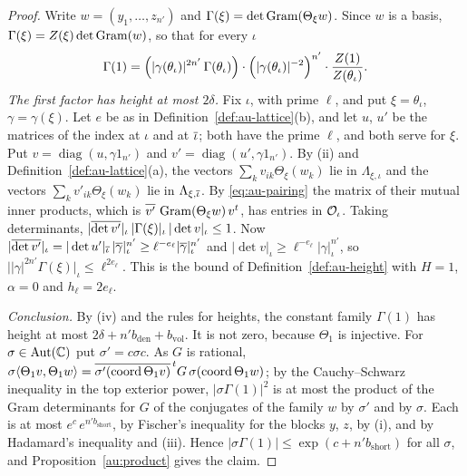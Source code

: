 \documentclass[10pt]{amsart}
\theoremstyle{definition}
\theoremstyle{remark}
\newcommand{\C}{\mathbb C}
\begin{document}
\begin{proof}
Write $w=(y_1,\dots,z_{n'})$ and $\Gamma(\xi)=\det\operatorname{Gram}(\Theta_\xi w)$. Since $w$ is a basis,
$\Gamma(\xi)=Z(\xi)\det\operatorname{Gram}(w)$, so that for every $\iota$
\begin{equation}\label{eq:au-factor}
\Gamma(1)=\Bigl(|\gamma(\theta_\iota)|^{2n'}\,\Gamma(\theta_\iota)\Bigr)\cdot
\Bigl(|\gamma(\theta_\iota)|^{-2}\Bigr)^{n'}\cdot\frac{Z(1)}{Z(\theta_\iota)} .
\end{equation}
\emph{The first factor has height at most $2\delta$.} Fix $\iota$, with prime $\ell$, and put
$\xi=\theta_\iota$, $\gamma=\gamma(\xi)$. Let $e$ be as in Definition~\ref{def:au-lattice}(b), and
let $u$, $u'$ be the matrices of the index at $\iota$ and at $\overline{\iota}$; both have the prime
$\ell$, and both serve for $\xi$. Put $v=\operatorname{diag}(u,\gamma1_{n'})$ and
$v'=\operatorname{diag}(u',\gamma1_{n'})$. By (ii) and Definition~\ref{def:au-lattice}(a), the
vectors $\sum_kv_{ik}\Theta_\xi(w_k)$ lie in $\Lambda_{\xi,\iota}$ and the vectors
$\sum_kv'_{ik}\Theta_\xi(w_k)$ lie in $\Lambda_{\xi,\overline{\iota}}$. By \eqref{eq:au-pairing} the
matrix of their mutual inner products, which is $\overline{v'}\,\operatorname{Gram}(\Theta_\xi w)\,v^{t}$, has
entries in $\mathcal O_\iota$. Taking determinants,
$|\overline{\det v'}|_\iota\,|\Gamma(\xi)|_\iota\,|\det v|_\iota\le1$. Now
$|\overline{\det v'}|_\iota=|\det u'|_{\overline{\iota}}\,|\overline{\gamma}|^{n'}_\iota\ge
\ell^{-e_\ell}|\overline{\gamma}|^{n'}_\iota$ and $|\det v|_\iota\ge\ell^{-e_\ell}|\gamma|_\iota^{n'}$,
so $\bigl||\gamma|^{2n'}\Gamma(\xi)\bigr|_\iota\le\ell^{2e_\ell}$. This is the bound of
Definition~\ref{def:au-height} with $H=1$, $\alpha=0$ and $h_\ell=2e_\ell$.

\emph{Conclusion.} By (iv) and the rules for heights, the constant family $\Gamma(1)$ has height at
most $2\delta+n'b_{\mathrm{den}}+b_{\mathrm{vol}}$. It is not zero, because $\Theta_1$ is injective.
For $\sigma\in\auAut(\C)$ put $\sigma'=c\sigma c$. As $G$ is rational,
$\sigma\langle\Theta_1v,\Theta_1w\rangle=\overline{\sigma'(\operatorname{coord}\Theta_1v)}^{\,t}G\,
\sigma(\operatorname{coord}\Theta_1w)$; by the Cauchy--Schwarz inequality in the top exterior
power, $|\sigma\Gamma(1)|^2$ is at most the product of the Gram determinants for $G$ of the
conjugates of the family $w$ by $\sigma'$ and by $\sigma$. Each is at most $e^{c}\,
e^{n'b_{\mathrm{short}}}$, by Fischer's inequality for the blocks $y$, $z$, by (i), and by
Hadamard's inequality and (iii). Hence $|\sigma\Gamma(1)|\le\exp(c+n'b_{\mathrm{short}})$ for all
$\sigma$, and Proposition~\ref{au:product} gives the claim.
\end{proof}
\end{document}
